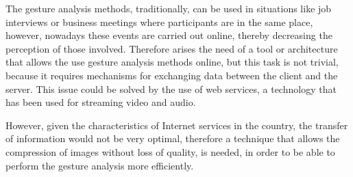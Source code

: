 The gesture analysis methods, traditionally, can be used in situations like job interviews or business meetings where participants are in the same place, however, nowadays these events are carried out online, thereby decreasing the perception of those involved. Therefore arises the need of a tool or architecture that allows the use gesture analysis methods online, but this task is not trivial, because it requires mechanisms for exchanging data between the client and the server. This issue could be solved by the use of web services, a technology that has been used for streaming video and audio.

However, given the characteristics of Internet services in the country, the transfer of information would not be very optimal, therefore a technique that allows the compression of images without loss of quality, is needed, in order to be able to perform the gesture analysis more efficiently.
